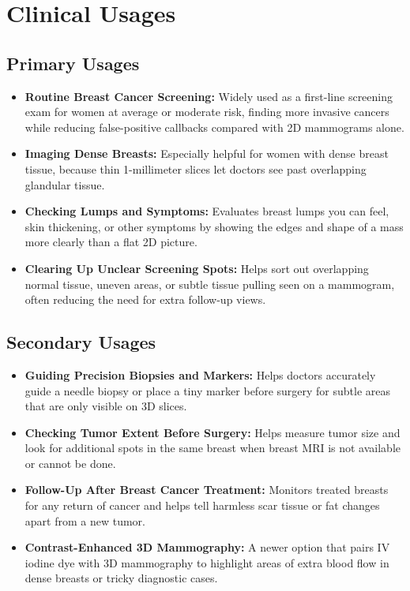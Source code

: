 \section{Clinical Usages}

\subsection{Primary Usages}
\begin{itemize}
\item \textbf{Routine Breast Cancer Screening:} Widely used as a first-line screening exam for women at average or moderate risk, finding more invasive cancers while reducing false-positive callbacks compared with 2D mammograms alone.
\item \textbf{Imaging Dense Breasts:} Especially helpful for women with dense breast tissue, because thin 1-millimeter slices let doctors see past overlapping glandular tissue.
\item \textbf{Checking Lumps and Symptoms:} Evaluates breast lumps you can feel, skin thickening, or other symptoms by showing the edges and shape of a mass more clearly than a flat 2D picture.
\item \textbf{Clearing Up Unclear Screening Spots:} Helps sort out overlapping normal tissue, uneven areas, or subtle tissue pulling seen on a mammogram, often reducing the need for extra follow-up views.
\end{itemize}

\subsection{Secondary Usages}
\begin{itemize}
\item \textbf{Guiding Precision Biopsies and Markers:} Helps doctors accurately guide a needle biopsy or place a tiny marker before surgery for subtle areas that are only visible on 3D slices.
\item \textbf{Checking Tumor Extent Before Surgery:} Helps measure tumor size and look for additional spots in the same breast when breast MRI is not available or cannot be done.
\item \textbf{Follow-Up After Breast Cancer Treatment:} Monitors treated breasts for any return of cancer and helps tell harmless scar tissue or fat changes apart from a new tumor.
\item \textbf{Contrast-Enhanced 3D Mammography:} A newer option that pairs IV iodine dye with 3D mammography to highlight areas of extra blood flow in dense breasts or tricky diagnostic cases.
\end{itemize}

